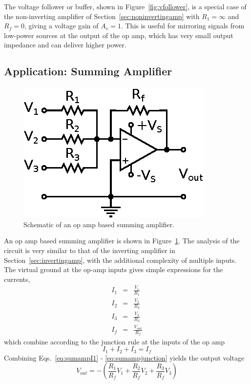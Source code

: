 \documentclass[11pt]{article}
\begin{document}
The voltage follower or buffer, shown in Figure~\ref{fig:vfollower},
is a special case of the non-inverting amplifier of
Section~\ref{sec:noninvertingamp} with $R_1 = \infty$ and $R_f = 0$, 
giving a voltage gain of $A_v = 1$.
This is useful for mirroring signals from low-power sources at the
output of the op amp, which has very small output impedance and can
deliver higher power.

\subsection{Application: Summing Amplifier}
\label{sec:summingamp}

\begin{figure}[h!]
  \begin{center}
    \includegraphics{summingamp.eps}
    \caption{Schematic of an op amp based summing amplifier.}
    \label{fig:summingamp}
  \end{center}
\end{figure}

An op amp based summing amplifier is shown in
Figure~\ref{fig:summingamp}. The analysis of the circuit is very
similar to that of the inverting amplifier in
Section~\ref{sec:invertingamp}, with the additional complexity of
multiple inputs. The virtual ground at the op-amp inputs gives simple
expressions for the currents,
\begin{eqnarray}
  \label{eq:sumampI1}
  I_1 &=& \frac{V_1}{R_1}\\
  I_2 &=& \frac{V_2}{R_2}\\
  I_3 &=& \frac{V_3}{R_3}\\
  I_f &=& \frac{V_{out}}{R_f}
\end{eqnarray}
which combine according to the junction rule at the inputs of
the op amp
\begin{equation}
  \label{eq:sumampjunction}
  I_1 + I_2 + I_3 = I_f
\end{equation}
Combining Eqs.~\ref{eq:sumampI1} - \ref{eq:sumampjunction} yields the
output voltage 
\begin{equation}
  \label{eq:summingampvout}
  V_{out} = -\left( \frac{R_1}{R_f} V_1 + \frac{R_2}{R_f} V_2
                 + \frac{R_3}{R_f} V_3 \right)  
\end{equation}
\end{document}
